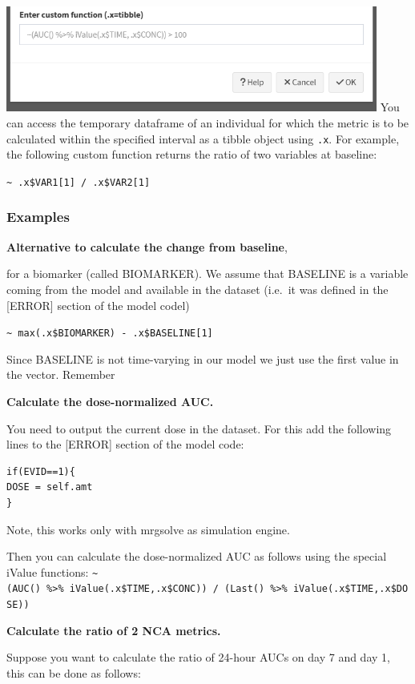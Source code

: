 \documentclass[
]{book}
\begin{document}
\includegraphics[width=4.8125in,height=\textheight]{pictures/custom-metric2.png} You can access the temporary dataframe of an individual for which the metric is to be calculated within the specified interval as a tibble object using \texttt{.x}. For example, the following custom function returns the ratio of two variables at baseline:

\texttt{\textasciitilde{}\ .x\$VAR1{[}1{]}\ /\ .x\$VAR2{[}1{]}}

\subsubsection{Examples}\label{examples}

\textbf{Alternative to calculate the change from baseline},

for a biomarker (called BIOMARKER). We assume that BASELINE is a variable coming from the model and available in the dataset (i.e.~it was defined in the {[}ERROR{]} section of the model codel)

\texttt{\textasciitilde{}\ max(.x\$BIOMARKER)\ -\ .x\$BASELINE{[}1{]}}

Since BASELINE is not time-varying in our model we just use the first value in the vector. Remember

\textbf{Calculate the dose-normalized AUC.}

You need to output the current dose in the dataset. For this add the following lines to the {[}ERROR{]} section of the model code:

\begin{verbatim}
if(EVID==1){
DOSE = self.amt
}
\end{verbatim}

Note, this works only with mrgsolve as simulation engine.

Then you can calculate the dose-normalized AUC as follows using the special iValue functions: \texttt{\textasciitilde{}(AUC()\ \%\textgreater{}\%\ iValue(.x\$TIME,.x\$CONC))\ /\ (Last()\ \%\textgreater{}\%\ iValue(.x\$TIME,.x\$DOSE))}

\textbf{Calculate the ratio of 2 NCA metrics.}

Suppose you want to calculate the ratio of 24-hour AUCs on day 7 and day 1, this can be done as follows:
\end{document}
